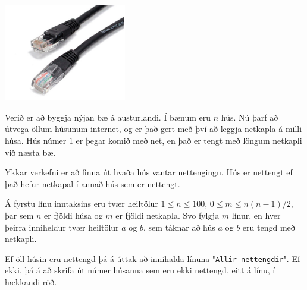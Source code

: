 
\includegraphics[width=0.4\textwidth]{cable.jpg}

Verið er að byggja nýjan bæ á austurlandi. Í bænum eru $n$ hús. Nú þarf að
útvega öllum húsunum internet, og er það gert með því að leggja netkapla á
milli húsa. Hús númer $1$ er þegar komið með net, en það er tengt með löngum
netkapli við næsta bæ.

Ykkar verkefni er að finna út hvaða hús vantar nettengingu. Hús er nettengt
ef það hefur netkapal í annað hús sem er nettengt.

Á fyrstu línu inntaksins eru tvær heiltölur $1 \leq n \leq 100$, $0 \leq m \leq
n(n-1)/2$, þar sem $n$ er fjöldi húsa og $m$ er fjöldi netkapla. Svo fylgja $m$
línur, en hver þeirra inniheldur tvær heiltölur $a$ og $b$, sem táknar að hús
$a$ og $b$ eru tengd með netkapli.

Ef öll húsin eru nettengd þá á úttak að innihalda línuna "\texttt{Allir
nettengdir}". Ef ekki, þá á að skrifa út númer húsanna sem eru ekki
nettengd, eitt á línu, í hækkandi röð.

